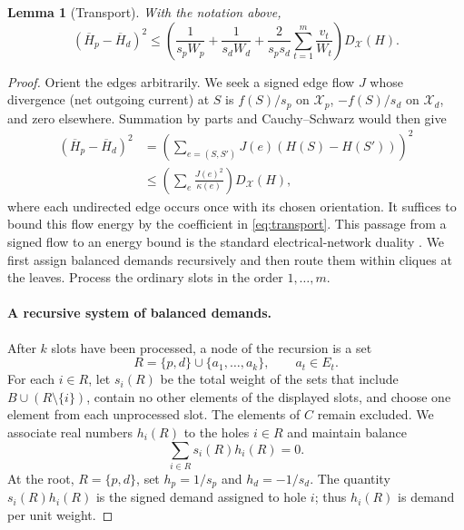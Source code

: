 \documentclass[11pt]{article}
\newtheorem{lemma}[theorem]{Lemma}
\theoremstyle{definition}
\begin{document}
\begin{lemma}[Transport]\label{lem:transport}
With the notation above,
\begin{equation}\label{eq:transport}
 (\overline H_p-\overline H_d)^2
 \le
 \left(\frac1{s_pW_p}+\frac1{s_dW_d}
       +\frac2{s_ps_d}\sum_{t=1}^m\frac{v_t}{W_t}\right)
 D_{\mathcal X}(H).
\end{equation}
\end{lemma}

\begin{proof}
Orient the edges arbitrarily.  We seek a signed edge flow $J$ whose
divergence (net outgoing current) at $S$ is $f(S)/s_p$ on
$\mathcal X_p$, $-f(S)/s_d$ on $\mathcal X_d$, and zero elsewhere.
Summation by parts and Cauchy--Schwarz would then give
\begin{equation}\label{eq:flowcriterion}
 \begin{split}
 (\overline H_p-\overline H_d)^2
 &=\left(\sum_{e=(S,S')}J(e)(H(S)-H(S'))\right)^2\\
 &\le\left(\sum_e\frac{J(e)^2}{\kappa(e)}\right)D_{\mathcal X}(H),
 \end{split}
\end{equation}
where each undirected edge occurs once with its chosen orientation.
It suffices to bound this flow energy by the coefficient in
\eqref{eq:transport}.  This passage from a signed flow to an energy
bound is the standard electrical-network duality
\cite[Section~1.3.5, 2006 web edition]{DoyleSnell2006}.
We first assign balanced demands recursively and
then route them within cliques at the leaves.  Process the ordinary slots
in the order $1,\ldots,m$.

\paragraph{A recursive system of balanced demands.}
After $k$ slots have been processed, a node of the recursion is a set
\[
 R=\{p,d\}\cup\{a_1,\ldots,a_k\},\qquad a_t\in E_t.
\]
For each $i\in R$, let $s_i(R)$ be the total weight of the sets that
include $B\cup(R\setminus\{i\})$, contain no other elements of the
displayed slots, and choose one element from each unprocessed slot.
The elements of $C$ remain excluded.  We associate real numbers $h_i(R)$
to the holes $i\in R$ and maintain balance
\begin{equation}\label{eq:balance}
 \sum_{i\in R}s_i(R)h_i(R)=0.
\end{equation}
At the root, $R=\{p,d\}$, set $h_p=1/s_p$ and $h_d=-1/s_d$.
The quantity $s_i(R)h_i(R)$ is the signed demand assigned to hole $i$;
thus $h_i(R)$ is demand per unit weight.


\end{proof}
\end{document}

